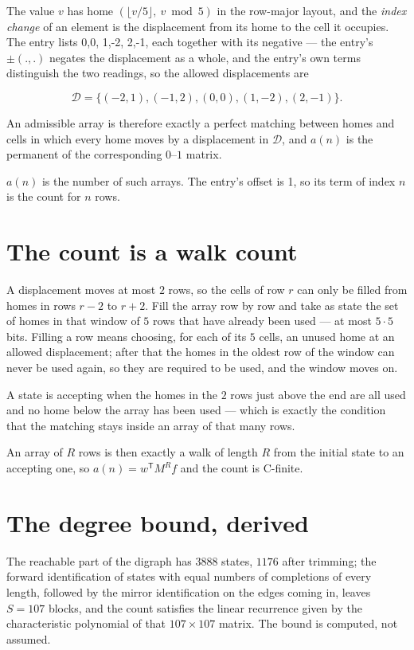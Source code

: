 \documentclass[11pt]{article}
\theoremstyle{definition}
\begin{document}
The value $v$ has home $(\lfloor v/5\rfloor,\ v \bmod 5)$ in the row-major layout, and the {\itshape index change} of an element is the displacement from its home to the cell it occupies. The entry lists 0,0, 1,-2, 2,-1, each together with its negative --- the entry's $\pm(.,.)$ negates the displacement as a whole, and the entry's own terms distinguish the two readings, so the allowed displacements are

\[\mathcal{D} = \{(-2,1), (-1,2), (0,0), (1,-2), (2,-1)\}.\]

An admissible array is therefore exactly a perfect matching between homes and cells in which every home moves by a displacement in $\mathcal{D}$, and $a(n)$ is the permanent of the corresponding $0$--$1$ matrix.

$a(n)$ is the number of such arrays. The entry's offset is 1, so its term of index $n$ is the count for $n$ rows.

\section{The count is a walk count}

A displacement moves at most $2$ rows, so the cells of row $r$ can only be filled from homes in rows $r-2$ to $r+2$. Fill the array row by row and take as state the set of homes in that window of $5$ rows that have already been used --- at most $5\cdot5$ bits. Filling a row means choosing, for each of its $5$ cells, an unused home at an allowed displacement; after that the homes in the oldest row of the window can never be used again, so they are required to be used, and the window moves on.

A state is accepting when the homes in the $2$ rows just above the end are all used and no home below the array has been used --- which is exactly the condition that the matching stays inside an array of that many rows.

An array of $R$ rows is then exactly a walk of length $R$ from the initial state to an accepting one, so $a(n) = w^{\mathsf T}M^{R}f$ and the count is C-finite.

\section{The degree bound, derived}

The reachable part of the digraph has $3888$ states, $1176$ after trimming; the forward identification of states with equal numbers of completions of every length, followed by the mirror identification on the edges coming in, leaves $S = 107$ blocks, and the count satisfies the linear recurrence given by the characteristic polynomial of that $107\times107$ matrix. The bound is computed, not assumed.
\end{document}
